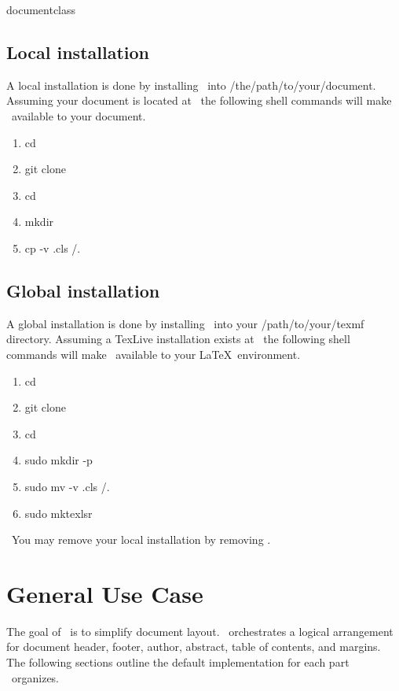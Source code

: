 documentclass\documentclass[12pt]{tlc-article}
\begin{document}
\subsection{Local installation}
A local installation is done by installing \tlcA\ into
/the/path/to/your/document.  Assuming your document is located at \tlcMyDoc\ the
following shell commands will make \tlcA\ available to your document.

\begin{enumerate}
  \item cd \tlcHome
  \item git clone \tlcRepo\
  \item cd \tlcProduct\
  \item mkdir \tlcMyDoc
  \item cp -v \tlcProduct.cls \tlcMyDoc/.
\end{enumerate}

\clearpage
\subsection{Global installation}
A global installation is done by installing \tlcA\ into your /path/to/your/texmf
directory.  Assuming a TexLive installation exists at \texDist\ the following
shell commands will make \tlcA\ available to your \LaTeX\ environment.

\begin{enumerate}
  \item cd \tlcHome
  \item git clone \tlcRepo\
  \item cd \tlcProduct\
  \item sudo mkdir -p \tlcGlobalDist
  \item sudo mv -v \tlcProduct.cls \tlcGlobalDist/.
  \item sudo mktexlsr \texDist\
\end{enumerate}

\bigskip
\tlcNote\ You may remove your local installation by removing \tlcA.

\clearpage
\section{General Use Case}
The goal of \tlcA\ is to simplify document layout.  \tlcA\ orchestrates a
logical arrangement for document header, footer, author, abstract, table of
contents, and margins.  The following sections outline the default
implementation for each part \tlcA\ organizes. 
\end{document}
